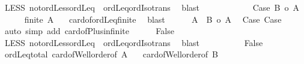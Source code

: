 \begin{isabellebody}
\ LESS{}\ not{\isacharunderscore}{\kern0pt}ordLess{\isacharunderscore}{\kern0pt}ordLeq\ {\isacharasterisk}{\kern0pt}\ ordLeq{\isacharunderscore}{\kern0pt}ordIso{\isacharunderscore}{\kern0pt}trans\ \isamarkupfalse%
\ blast\isanewline
\ \ \ \isacommand{{\isacharbraceright}{\kern0pt}}\isamarkupfalse%
\isanewline
\ \ \ \isamarkupfalse%
\isanewline
\ \ \ \isacommand{{\isacharbraceleft}{\kern0pt}}\isamarkupfalse%
\isamarkupfalse%
\ Case{}{}{\isacharcolon}{\kern0pt}\ {\isachardoublequoteopen}{\isacharbar}{\kern0pt}B{\isacharbar}{\kern0pt}\ {\isasymle}o\ {\isacharbar}{\kern0pt}A{\isacharbar}{\kern0pt}{\isachardoublequoteclose}\isanewline
\ \ \ \ \isamarkupfalse%
\ {\isachardoublequoteopen}{\isasymnot}finite\ A{\isachardoublequoteclose}\ \isamarkupfalse%
\ {}\ card{\isacharunderscore}{\kern0pt}of{\isacharunderscore}{\kern0pt}ordLeq{\isacharunderscore}{\kern0pt}finite\ \isamarkupfalse%
\ blast\isanewline
\ \ \ \ \isamarkupfalse%
\ {\isachardoublequoteopen}{\isacharbar}{\kern0pt}A\ {\isacharless}{\kern0pt}{\isacharplus}{\kern0pt}{\isachargreater}{\kern0pt}\ B{\isacharbar}{\kern0pt}\ {\isacharequal}{\kern0pt}o\ {\isacharbar}{\kern0pt}A{\isacharbar}{\kern0pt}{\isachardoublequoteclose}\ \isamarkupfalse%
\ Case{}\ Case{}{}\isanewline
\ \ \ \ \isamarkupfalse%
\ {\isacharparenleft}{\kern0pt}auto\ simp\ add{\isacharcolon}{\kern0pt}\ card{\isacharunderscore}{\kern0pt}of{\isacharunderscore}{\kern0pt}Plus{\isacharunderscore}{\kern0pt}infinite{\isacharparenright}{\kern0pt}\isanewline
\ \ \ \ \isamarkupfalse%
\ False\ \isamarkupfalse%
\ LESS{}\ not{\isacharunderscore}{\kern0pt}ordLess{\isacharunderscore}{\kern0pt}ordLeq\ {\isacharasterisk}{\kern0pt}\ ordLeq{\isacharunderscore}{\kern0pt}ordIso{\isacharunderscore}{\kern0pt}trans\ \isamarkupfalse%
\ blast\isanewline
\ \ \ \isacommand{{\isacharbraceright}{\kern0pt}}\isamarkupfalse%
\isanewline
\ \ \ \isamarkupfalse%
\ \isamarkupfalse%
\ False\ \isamarkupfalse%
\ ordLeq{\isacharunderscore}{\kern0pt}total\ card{\isacharunderscore}{\kern0pt}of{\isacharunderscore}{\kern0pt}Well{\isacharunderscore}{\kern0pt}order{\isacharbrackleft}{\kern0pt}of\ A{\isacharbrackright}{\kern0pt}\isanewline
\ \ \ card{\isacharunderscore}{\kern0pt}of{\isacharunderscore}{\kern0pt}Well{\isacharunderscore}{\kern0pt}order{\isacharbrackleft}{\kern0pt}of\ B{\isacharbrackright}{\kern0pt}\ \isamarkupfalse%

\end{isabellebody}
